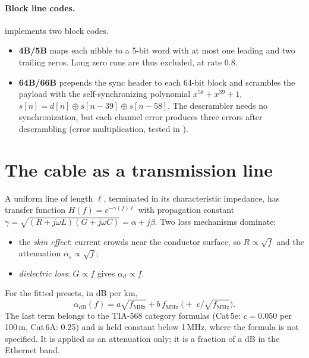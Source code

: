 \paragraph{Block line codes.}
 implements two block codes.
\begin{itemize}
  \item \textbf{4B/5B} maps each nibble to a 5-bit word with at most one leading and two trailing
  zeros. Long zero runs are thus excluded, at rate $0.8$.
  \item \textbf{64B/66B} prepends the sync header  to each 64-bit block and scrambles
  the payload with the self-synchronizing polynomial $x^{58}+x^{39}+1$,
  $s[n]=d[n]\oplus s[n-39]\oplus s[n-58]$. The descrambler needs no synchronization, but each
  channel error produces three errors after descrambling (error multiplication, tested in
  ).
\end{itemize}

\section{The cable as a transmission line}\label{sec:cable}
A uniform line of length $\ell$, terminated in its characteristic impedance, has transfer
function $H(f)=e^{-\gamma(f)\ell}$ with propagation constant
$\gamma=\sqrt{(R+j\omega L)(G+j\omega C)}=\alpha+j\beta$. Two loss mechanisms dominate:
\begin{itemize}
  \item the \emph{skin effect}: current crowds near the conductor surface, so $R\propto\sqrt f$
  and the attenuation $\alpha_s\propto\sqrt f$;
  \item \emph{dielectric loss}: $G\propto f$ gives $\alpha_d\propto f$.
\end{itemize}
For the fitted presets, in dB per km,
\begin{equation}
  \alpha_{\mathrm{dB}}(f)=a\sqrt{f_{\mathrm{MHz}}}+b\,f_{\mathrm{MHz}}\;\Big(+\;c/\sqrt{f_{\mathrm{MHz}}}\Big) .
\end{equation}
The last term belongs to the TIA-568 category formulas (Cat\,5e: $c=0.050$ per 100\,m, Cat\,6A: 0.25)
and is held constant below 1\,MHz, where the formula is not specified. It is applied as an
attenuation only; it is a fraction of a dB in the Ethernet band.

